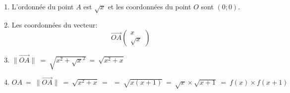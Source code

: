 \documentclass[a4paper,10pt]{article}
\newcommand{\V}{\overrightarrow}
\begin{document}
\begin{enumerate}
\begin{enumerate}
	
	\item L'ordonnée du point $A$ est $\sqrt{x}$ et les coordonnées du point $O$ sont $\left(0;0\right)$.\\ 
	\item Les coordonnées du vecteur: $$\V{OA} \left(\begin{array}{c}x\\\sqrt{x}	\end{array}\right)$$
	\item  $\|\V{OA}\| \ = \  \sqrt{x^2 + \sqrt{x}^2} \ = \ \sqrt{x^2 + x}$\\ 
	\item   $OA \ = \ \|\V{OA}\| \ = \ \sqrt{x^2 + x} \ = \ \ = \ \sqrt{x(x+1)} \ = \ \sqrt{x}\times\sqrt{x+1} \ = \ f(x)\times f(x+1)$
\end{enumerate}  	 

\end{enumerate}


	
	
\end{document}
